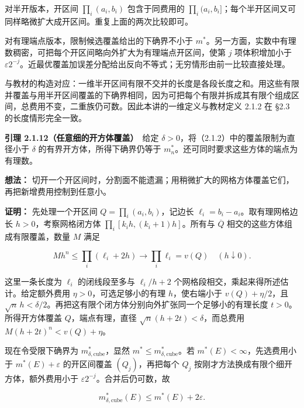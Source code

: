 \documentclass[11pt,a4paper]{article}
\begin{document}
对半开版本，开区间 \(\prod_i(a_i,b_i)\) 包含于同费用的
\(\prod_i(a_i,b_i]\)；每个半开区间又可同样略微扩大成开区间。重复上面的两次比较即可。

对有理端点版本，限制候选覆盖给出的下确界不小于
\(m^*\)。另一方面，实数中有理数稠密，可把每个开区间略向外扩大为有理端点开区间，使第
\(j\) 项体积增加小于
\(\varepsilon2^{-j}\)。近最优覆盖加误差分配给出反向不等式；无穷情形由前一比较直接处理。

与教材的构造对应：一维半开区间有限不交并的长度是各段长度之和。用这些有限并覆盖与用半开区间覆盖的下确界相同，因为可把每个有限并拆成其有限个组成区间，总费用不变，二重族仍可数。因此本讲的一维定义与教材定义
2.1.2 在 §2.3 的长度情形完全一致。

\textbf{引理 2.1.12（任意细的开方体覆盖）}　给定
\(\delta>0\)，将（2.1.2）中的覆盖限制为直径小于 \(\delta\)
的有界开方体，所得下确界仍等于
\(m_n^*\)。还可同时要求这些方体的端点为有理数。

\textbf{想法：}
切开一个开区间时，分割面不能遗漏；用稍微扩大的网格方体覆盖它们，再把新增费用控制到任意小。

\textbf{证明：} 先处理一个开区间 \(Q=\prod_i(a_i,b_i)\)，记边长
\(\ell_i=b_i-a_i\)。取有理网格边长 \(h>0\)，考察网格闭方体
\(\prod_i[k_ih,(k_i+1)h]\)。所有与 \(\overline Q\)
相交的这些方体组成有限覆盖，数量 \(M\) 满足

\begin{equation*}
Mh^n\le\prod_i(\ell_i+2h)\longrightarrow\prod_i\ell_i=v(Q)
\quad(h\downarrow0).
\tag{2.1.17}
\end{equation*}

这里一条长度为 \(\ell_i\) 的闭线段至多与 \(\ell_i/h+2\)
个网格段相交，乘起来得所述估计。给定额外费用
\(\eta>0\)，可选足够小的有理 \(h\)，使右端小于 \(v(Q)+\eta/2\)，且
\(\sqrt n\,h<\delta/2\)。再把这有限个闭方体分别向外扩张同一个足够小的有理长度
\(t>0\)。所得开方体覆盖 \(Q\)，端点有理，直径
\(\sqrt n(h+2t)<\delta\)，而总费用 \(M(h+2t)^n<v(Q)+\eta\)。

现在令受限下确界为 \(m^*_{\delta,\mathrm{cube}}\)，显然
\(m^*\le m^*_{\delta,\mathrm{cube}}\)。若
\(m^*(E)<\infty\)，先选费用小于 \(m^*(E)+\varepsilon\) 的开区间覆盖
\((Q_j)\)，再把每个 \(Q_j\) 按刚才方法换成有限个细开方体，额外费用小于
\(\varepsilon2^{-j}\)。合并后仍可数，故

\begin{equation*}
m^*_{\delta,\mathrm{cube}}(E)\le m^*(E)+2\varepsilon.
\tag{2.1.18}
\end{equation*}
\end{document}
